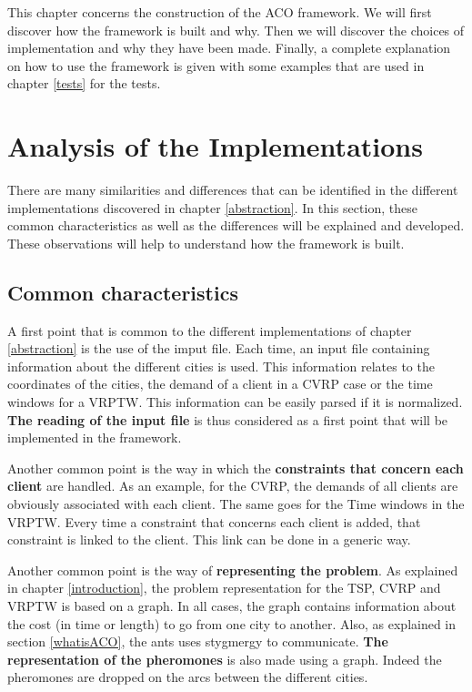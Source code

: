 This chapter concerns the construction of the ACO framework. We will first discover how the framework is built and why. Then we will discover the choices of implementation and why they have been made. Finally, a complete explanation on how to use the framework is given with some examples that are used in chapter \ref{tests} for the tests.

\section{Analysis of the Implementations}\label{analysis}
There are many similarities and differences that can be identified in the different implementations discovered in chapter \ref{abstraction}. In this section, these common characteristics as well as the differences will be explained and developed. These observations will help to understand how the framework is built.

\subsection {Common characteristics}\label{common}

A first point that is common to the different implementations of chapter \ref{abstraction} is the use of the imput file. Each time, an input file containing information about the different cities is used. This information relates to the coordinates of the cities, the demand of a client in a CVRP case or the time windows for a VRPTW. This information can be easily parsed if it is normalized. \textbf{The reading of the input file} is thus considered as a first point that will be implemented in the framework.
 
Another common point is the way in which the \textbf{constraints that concern each client} are handled. As an example, for the CVRP, the demands of all clients are obviously associated with each client. The same goes for the Time windows in the VRPTW. Every time a constraint that concerns each client is added, that constraint is linked to the client. This link can be done in a generic way.

Another common point is the way of \textbf{representing the problem}. As explained in chapter \ref{introduction}, the problem representation for the TSP, CVRP and VRPTW is based on a graph. In all cases, the graph contains information about the cost (in time or length) to go from one city to another. Also, as explained in section \ref{whatisACO}, the ants uses stygmergy to communicate. \textbf{The representation of the pheromones} is also made using a graph. Indeed the pheromones are dropped on the arcs between the different cities.

